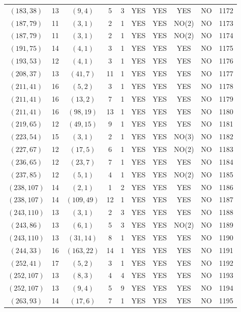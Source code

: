 \begin{longtable}{|c|c|c|c|c|c|c|c|c|c|}
$(183, 38)$ & 13 & $(9, 4)$ & 5 & 3 & YES & YES & YES & NO & 1172\\
$(187, 79)$ & 11 & $(3, 1)$ & 2 & 1 & YES & YES & NO(2) & NO & 1173\\
$(187, 79)$ & 11 & $(3, 1)$ & 2 & 1 & YES & YES & NO(2) & NO & 1174\\
$(191, 75)$ & 14 & $(4, 1)$ & 3 & 1 & YES & YES & YES & NO & 1175\\
$(193, 53)$ & 12 & $(4, 1)$ & 3 & 1 & YES & YES & YES & NO & 1176\\
$(208, 37)$ & 13 & $(41, 7)$ & 11 & 1 & YES & YES & YES & NO & 1177\\
$(211, 41)$ & 16 & $(5, 2)$ & 3 & 1 & YES & YES & YES & NO & 1178\\
$(211, 41)$ & 16 & $(13, 2)$ & 7 & 1 & YES & YES & YES & NO & 1179\\
$(211, 41)$ & 16 & $(98, 19)$ & 13 & 1 & YES & YES & YES & NO & 1180\\
$(219, 65)$ & 12 & $(49, 15)$ & 9 & 1 & YES & YES & YES & NO & 1181\\
$(223, 54)$ & 15 & $(3, 1)$ & 2 & 1 & YES & YES & NO(3) & NO & 1182\\
$(227, 67)$ & 12 & $(17, 5)$ & 6 & 1 & YES & YES & NO(2) & NO & 1183\\
$(236, 65)$ & 12 & $(23, 7)$ & 7 & 1 & YES & YES & YES & NO & 1184\\
$(237, 85)$ & 12 & $(5, 1)$ & 4 & 1 & YES & YES & NO(2) & NO & 1185\\
$(238, 107)$ & 14 & $(2, 1)$ & 1 & 2 & YES & YES & YES & NO & 1186\\
$(238, 107)$ & 14 & $(109, 49)$ & 12 & 1 & YES & YES & YES & NO & 1187\\
$(243, 110)$ & 13 & $(3, 1)$ & 2 & 3 & YES & YES & YES & NO & 1188\\
$(243, 86)$ & 13 & $(6, 1)$ & 5 & 3 & YES & YES & NO(2) & NO & 1189\\
$(243, 110)$ & 13 & $(31, 14)$ & 8 & 1 & YES & YES & YES & NO & 1190\\
$(244, 33)$ & 16 & $(163, 22)$ & 14 & 1 & YES & YES & YES & NO & 1191\\
$(252, 41)$ & 17 & $(5, 2)$ & 3 & 1 & YES & YES & YES & NO & 1192\\
$(252, 107)$ & 13 & $(8, 3)$ & 4 & 4 & YES & YES & YES & NO & 1193\\
$(252, 107)$ & 13 & $(9, 4)$ & 5 & 9 & YES & YES & YES & NO & 1194\\
$(263, 93)$ & 14 & $(17, 6)$ & 7 & 1 & YES & YES & YES & NO & 1195\\

\end{longtable}

